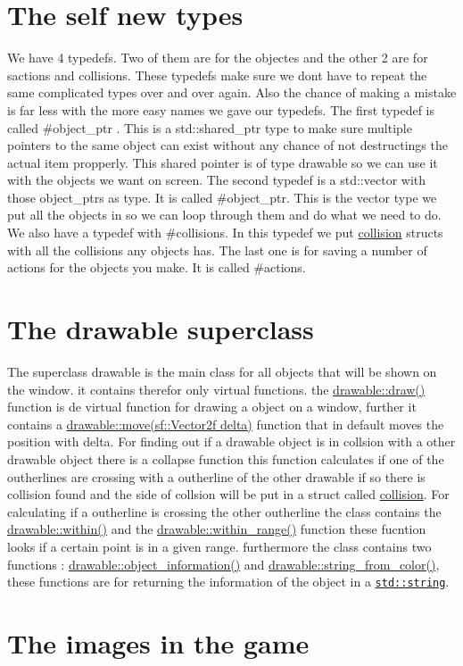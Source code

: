 \hypertarget{index_typedefs}{}\section{The self new types}\label{index_typedefs}
We have 4 typedefs. Two of them are for the objectes and the other 2 are for sactions and collisions. These typedefs make sure we dont have to repeat the same complicated types over and over again. Also the chance of making a mistake is far less with the more easy names we gave our typedefs. The first typedef is called \#object\+\_\+ptr . This is a std\+::shared\+\_\+ptr type to make sure multiple pointers to the same object can exist without any chance of not destructings the actual item propperly. This shared pointer is of type drawable so we can use it with the objects we want on screen. The second typedef is a std\+::vector with those object\+\_\+ptrs as type. It is called \#object\+\_\+ptr. This is the vector type we put all the objects in so we can loop through them and do what we need to do. We also have a typedef with \#collisions. In this typedef we put \hyperlink{structcollision}{collision} structs with all the collisions any objects has. The last one is for saving a number of actions for the objects you make. It is called \#actions.\hypertarget{index_drawable}{}\section{The drawable superclass}\label{index_drawable}
The superclass drawable is the main class for all objects that will be shown on the window. it contains therefor only virtual functions. the \hyperlink{classdrawable_a4e49e2c1121704c83ce24c5f48dd910f}{drawable\+::draw()} function is de virtual function for drawing a object on a window, further it contains a \hyperlink{classdrawable_ad0d3930c045cc6776aa2c3965be32491}{drawable\+::move(sf\+::\+Vector2f delta)} function that in default moves the position with delta. For finding out if a drawable object is in collsion with a other drawable object there is a collapse function this function calculates if one of the outherlines are crossing with a outherline of the other drawable if so there is collision found and the side of collsion will be put in a struct called \hyperlink{structcollision}{collision}. For calculating if a outherline is crossing the other outherline the class contains the \hyperlink{classdrawable_a0d3278e4e888fc8289468e8893dd8329}{drawable\+::within()} and the \hyperlink{classdrawable_ab5c0e1af885f214bc9ef0da47cdb5ac9}{drawable\+::within\+\_\+range()} function these fucntion looks if a certain point is in a given range. furthermore the class contains two functions \+: \hyperlink{classdrawable_a2ed0f8bb53f33477f7722efa7bb24583}{drawable\+::object\+\_\+information()} and \hyperlink{classdrawable_add3d8569fe2616ae0ed503b19c92c08e}{drawable\+::string\+\_\+from\+\_\+color()}, these functions are for returning the information of the object in a \href{http://www.cplusplus.com/reference/string/string/string/}{\tt std\+::string}.\hypertarget{index_images}{}\section{The images in the game}\label{index_images}
